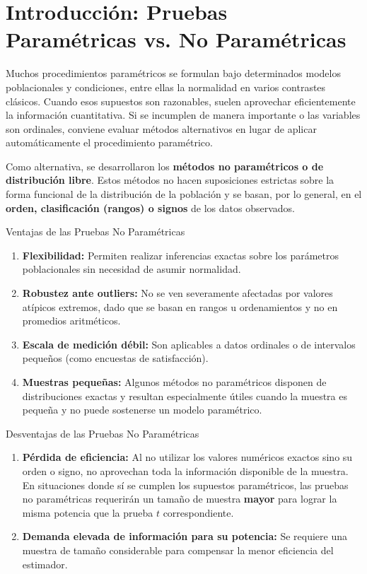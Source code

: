\documentclass[11pt,a4paper]{article}
\begin{document}
\section{Introducción: Pruebas Paramétricas vs. No Paramétricas}
Muchos procedimientos paramétricos se formulan bajo determinados modelos poblacionales y condiciones, entre ellas la normalidad en varios contrastes clásicos. Cuando esos supuestos son razonables, suelen aprovechar eficientemente la información cuantitativa. Si se incumplen de manera importante o las variables son ordinales, conviene evaluar métodos alternativos en lugar de aplicar automáticamente el procedimiento paramétrico.

Como alternativa, se desarrollaron los \textbf{métodos no paramétricos o de distribución libre}. Estos métodos no hacen suposiciones estrictas sobre la forma funcional de la distribución de la población y se basan, por lo general, en el \textbf{orden, clasificación (rangos) o signos} de los datos observados.

\begin{subsection}{Ventajas de las Pruebas No Paramétricas}
    \begin{enumerate}
        \item \textbf{Flexibilidad:} Permiten realizar inferencias exactas sobre los parámetros poblacionales sin necesidad de asumir normalidad.
        \item \textbf{Robustez ante outliers:} No se ven severamente afectadas por valores atípicos extremos, dado que se basan en rangos u ordenamientos y no en promedios aritméticos.
        \item \textbf{Escala de medición débil:} Son aplicables a datos ordinales o de intervalos pequeños (como encuestas de satisfacción).
        \item \textbf{Muestras pequeñas:} Algunos métodos no paramétricos disponen de distribuciones exactas y resultan especialmente útiles cuando la muestra es pequeña y no puede sostenerse un modelo paramétrico.
    \end{enumerate}
\end{subsection}

\begin{subsection}{Desventajas de las Pruebas No Paramétricas}
    \begin{enumerate}
        \item \textbf{Pérdida de eficiencia:} Al no utilizar los valores numéricos exactos sino su orden o signo, no aprovechan toda la información disponible de la muestra. En situaciones donde sí se cumplen los supuestos paramétricos, las pruebas no paramétricas requerirán un tamaño de muestra \textbf{mayor} para lograr la misma potencia que la prueba $t$ correspondiente.
        \item \textbf{Demanda elevada de información para su potencia:} Se requiere una muestra de tamaño considerable para compensar la menor eficiencia del estimador.
    \end{enumerate}
\end{subsection}
\end{document}
